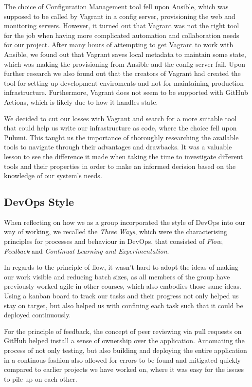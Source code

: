 The choice of Configuration Management tool fell upon Ansible, which was supposed to be called by Vagrant in a config server, provisioning the web and monitoring servers.
However, it turned out that Vagrant was not the right tool for the job when having more complicated automation and collaboration needs for our project.
After many hours of attempting to get Vagrant to work with Ansible, we found out that Vagrant saves local metadata to maintain some state, which was making the provisioning from Ansible and the config server fail\cite{issue178-vagrant-ansible}. Upon further research we also found out that the creators of Vagrant had created the tool for setting up development enviroments and not for maintaining production infrastructure\cite{vagrant_vs_terraform}. Furthermore, Vagrant does not seem to be supported with GitHub Actions, which is likely due to how it handles state.

We decided to cut our losses with Vagrant and search for a more suitable tool that could help us write our infrastructure as code,
where the choice fell upon Pulumi.
This taught us the importance of thoroughly researching the available tools to navigate through their advantages and drawbacks. 
It was a valuable lesson to see the difference it made when taking the time to investigate different tools and their properties in order to make an informed decision based on the knowledge of our system's needs.

\subsection{DevOps Style}
When reflecting on how we as a group incorporated the style of DevOps into our way of working, we recalled the \textit{Three Ways}, which were the characterising principles for processes and behaviour in DevOps, that consisted of \textit{Flow}, \textit{Feedback} and \textit{Continual Learning and Experimentation}\cite{devopshandbook}.

In regards to the principle of flow, it wasn't hard to adopt the ideas of making our work visible and reducing batch sizes, as all members of the group have previously worked agile in other courses, which also embodies those same ideas. Using a kanban board to track our tasks and their progress not only helped us stay on target, but also helped us with confining each task such that it could be deployed continuously\cite{devopshandbook}.

For the principle of feedback, the concept of peer reviewing via pull requests on GitHub helped install a sense of ownership over the application. Automating the process of not only testing, but also building and deploying the entire application in a continous fashion also allowed for errors to be found and mitigated quickly compared to earlier projects we have worked on, where it was easy for the issues to pile up on each other.

